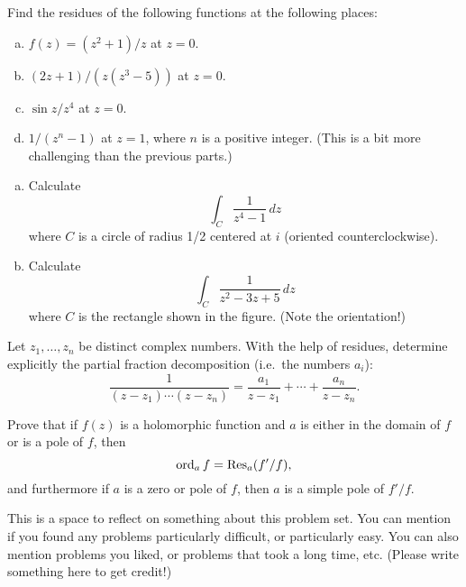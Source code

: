 \begin{problem}
  Find the residues of the following functions at the following places:
  \begin{enumerate}[(a)]
    \item $f(z)=(z^2+1)/z$ at $z=0$.
    \item $(2z+1)/(z(z^3-5))$ at $z=0$.
    \item $\sin z/z^4$ at $z=0$.
    \item $1/(z^n-1)$ at $z=1$, where $n$ is a positive integer. (This is a bit more challenging than the previous parts.)
  \end{enumerate}
\end{problem}

\begin{problem}
  \leavevmode\begin{enumerate}[(a)]
    \item Calculate
    \[\int_C\frac 1{z^4-1}\,dz\]
    where $C$ is a circle of radius 1/2 centered at $i$ (oriented counterclockwise).
    \item Calculate
    \[\int_C\frac 1{z^2-3z+5}\,dz\]
    where $C$ is the rectangle shown in the figure. (Note the orientation!)
    \begin{center}
    \end{center}
  \end{enumerate}
\end{problem}

\begin{problem}
  Let $z_1,\dots,z_n$ be distinct complex numbers. With the help of residues, determine explicitly the partial fraction decomposition (i.e.\ the numbers $a_i$):
  \[\frac 1{(z-z_1)\cdots(z-z_n)}=\frac{a_1}{z-z_1}+\cdots+\frac{a_n}{z-z_n}.\]
\end{problem}

\begin{problem}
  Prove that if $f(z)$ is a holomorphic function and $a$ is either in the domain of $f$ or is a pole of $f$, then
  \[\operatorname{ord}_a f=\operatorname{Res}_a(f'/f),\]
  and furthermore if $a$ is a zero or pole of $f$, then $a$ is a simple pole of $f'/f$.
\end{problem}

\begin{problem}
  This is a space to reflect on something about this problem set. You can mention if you found any problems particularly difficult, or particularly easy. You can also mention problems you liked, or problems that took a long time, etc. (Please write something here to get credit!)
\end{problem}
